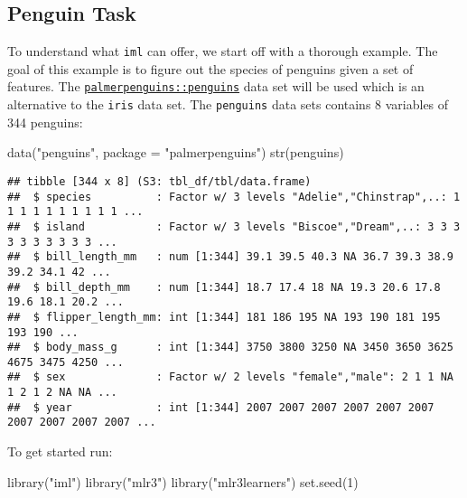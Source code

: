 \documentclass[
]{scrbook}
\newenvironment{Shaded}{\begin{snugshade}}{\end{snugshade}}
\newcommand{\AttributeTok}[1]{\textcolor[rgb]{0.77,0.63,0.00}{#1}}
\newcommand{\DecValTok}[1]{\textcolor[rgb]{0.00,0.00,0.81}{#1}}
\newcommand{\FunctionTok}[1]{\textcolor[rgb]{0.00,0.00,0.00}{#1}}
\newcommand{\NormalTok}[1]{#1}
\newcommand{\StringTok}[1]{\textcolor[rgb]{0.31,0.60,0.02}{#1}}
\renewenvironment{Shaded} {\begin{snugshade}\small} {\end{snugshade}}
\begin{document}
\hypertarget{penguin-task}{%
\subsection{Penguin Task}\label{penguin-task}}

To understand what \texttt{iml} can offer, we start off with a thorough example. The goal of this example is to figure out the species of penguins given a set of features. The \href{https://www.rdocumentation.org/packages/palmerpenguins/topics/penguins}{\texttt{palmerpenguins::penguins}} data set will be used which is an alternative to the \texttt{iris} data set.
The \texttt{penguins} data sets contains 8 variables of 344 penguins:

\begin{Shaded}
\begin{Highlighting}[]
\FunctionTok{data}\NormalTok{(}\StringTok{"penguins"}\NormalTok{, }\AttributeTok{package =} \StringTok{"palmerpenguins"}\NormalTok{)}
\FunctionTok{str}\NormalTok{(penguins)}
\end{Highlighting}
\end{Shaded}

\begin{verbatim}
## tibble [344 x 8] (S3: tbl_df/tbl/data.frame)
##  $ species          : Factor w/ 3 levels "Adelie","Chinstrap",..: 1 1 1 1 1 1 1 1 1 1 ...
##  $ island           : Factor w/ 3 levels "Biscoe","Dream",..: 3 3 3 3 3 3 3 3 3 3 ...
##  $ bill_length_mm   : num [1:344] 39.1 39.5 40.3 NA 36.7 39.3 38.9 39.2 34.1 42 ...
##  $ bill_depth_mm    : num [1:344] 18.7 17.4 18 NA 19.3 20.6 17.8 19.6 18.1 20.2 ...
##  $ flipper_length_mm: int [1:344] 181 186 195 NA 193 190 181 195 193 190 ...
##  $ body_mass_g      : int [1:344] 3750 3800 3250 NA 3450 3650 3625 4675 3475 4250 ...
##  $ sex              : Factor w/ 2 levels "female","male": 2 1 1 NA 1 2 1 2 NA NA ...
##  $ year             : int [1:344] 2007 2007 2007 2007 2007 2007 2007 2007 2007 2007 ...
\end{verbatim}

To get started run:

\begin{Shaded}
\begin{Highlighting}[]
\FunctionTok{library}\NormalTok{(}\StringTok{"iml"}\NormalTok{)}
\FunctionTok{library}\NormalTok{(}\StringTok{"mlr3"}\NormalTok{)}
\FunctionTok{library}\NormalTok{(}\StringTok{"mlr3learners"}\NormalTok{)}
\FunctionTok{set.seed}\NormalTok{(}\DecValTok{1}\NormalTok{)}
\end{Highlighting}
\end{Shaded}
\end{document}
